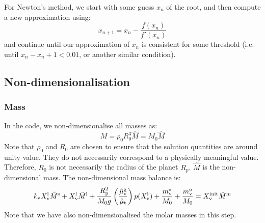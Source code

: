 For Newton's method, we start with some guess $x_n$ of the root, and then compute a new approximation using: 
\begin{equation}
    x_{n+1} = x_n - \frac{f(x_n)}{f'(x_n)}
\end{equation}
and continue until our approximation of $x_n$ is consistent for some threshold (i.e. until $x_n-x_n+1<0.01$, or another similar condition). 

\subsection{Non-dimensionalisation}
\subsubsection{Mass}
In the code, we non-dimensionalise all masses as:
\begin{equation}
M = \rho_0 R_0^3 \hat{M} = M_0 \hat{M}
\end{equation}
Note that $\rho_0$ and $R_0$ are chosen to ensure that the solution quantities are around unity value.  They do not necessarily correspond to a physically meaningful value.  Therefore, $R_0$ is not necessarily the radius of the planet $R_p$.  $\hat{M}$ is the non-dimensional mass.  The non-dimensional mass balance is:
\begin{equation}
k_{\rm v} X_{\rm v}^{\rm l} \hat{M}^{\rm s} + X_{\rm v}^{\rm l} \hat{M}^{\rm l} + \frac{R_{\rm p}^2}{M_0 g} \left( \frac{\hat{\mu}_{\rm v}^{\rm g}}{\hat{\mu}_{\rm t}} \right) p (X_{\rm v}^{\rm l}) + \frac{m_{\rm v}^{\rm e}}{M_0} + \frac{m_{\rm v}^{\rm o}}{M_0} = X_{\rm v}^{\rm init} \hat{M}^{\rm m}
\end{equation}
Note that we have also non-dimensionalised the molar masses in this step.

